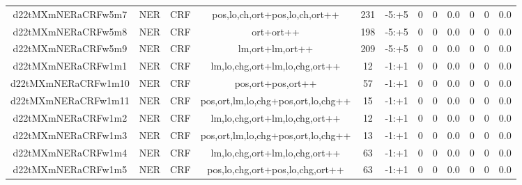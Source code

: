 \documentclass[a4paper]{article}
\begin{document}
\begin{landscape}
\begin{center}
\begin{tabular}{ |c|c|c|c|c|c|c|c|c|c|c|c|}
 
 	
 	\small{ d22tMXmNERaCRFw5m7 } & \small{ NER} & \small{  CRF }  & pos,lo,ch,ort+pos,lo,ch,ort++  &  231 &  \small{  -5:+5 }  &  0 & 0 & 0.0  &  0 & 0 & 0.0 \\
 	

 
 	
 	\small{ d22tMXmNERaCRFw5m8 } & \small{ NER} & \small{  CRF }  & ort+ort++  &  198 &  \small{  -5:+5 }  &  0 & 0 & 0.0  &  0 & 0 & 0.0 \\
 	

 
 	
 	\small{ d22tMXmNERaCRFw5m9 } & \small{ NER} & \small{  CRF }  & lm,ort+lm,ort++  &  209 &  \small{  -5:+5 }  &  0 & 0 & 0.0  &  0 & 0 & 0.0 \\
 	

 
 	
 	\small{ d22tMXmNERaCRFw1m1 } & \small{ NER} & \small{  CRF }  & lm,lo,chg,ort+lm,lo,chg,ort++  &  12 &  \small{  -1:+1 }  &  0 & 0 & 0.0  &  0 & 0 & 0.0 \\
 	

 
 	
 	\small{ d22tMXmNERaCRFw1m10 } & \small{ NER} & \small{  CRF }  & pos,ort+pos,ort++  &  57 &  \small{  -1:+1 }  &  0 & 0 & 0.0  &  0 & 0 & 0.0 \\
 	

 
 	
 	\small{ d22tMXmNERaCRFw1m11 } & \small{ NER} & \small{  CRF }  & pos,ort,lm,lo,chg+pos,ort,lo,chg++  &  15 &  \small{  -1:+1 }  &  0 & 0 & 0.0  &  0 & 0 & 0.0 \\
 	

 
 	
 	\small{ d22tMXmNERaCRFw1m2 } & \small{ NER} & \small{  CRF }  & lm,lo,chg,ort+lm,lo,chg,ort++  &  12 &  \small{  -1:+1 }  &  0 & 0 & 0.0  &  0 & 0 & 0.0 \\
 	

 
 	
 	\small{ d22tMXmNERaCRFw1m3 } & \small{ NER} & \small{  CRF }  & pos,ort,lm,lo,chg+pos,ort,lo,chg++  &  13 &  \small{  -1:+1 }  &  0 & 0 & 0.0  &  0 & 0 & 0.0 \\
 	

 
 	
 	\small{ d22tMXmNERaCRFw1m4 } & \small{ NER} & \small{  CRF }  & lm,lo,chg,ort+lm,lo,chg,ort++  &  63 &  \small{  -1:+1 }  &  0 & 0 & 0.0  &  0 & 0 & 0.0 \\
 	

 
 	
 	\small{ d22tMXmNERaCRFw1m5 } & \small{ NER} & \small{  CRF }  & pos,lo,chg,ort+pos,lo,chg,ort++  &  63 &  \small{  -1:+1 }  &  0 & 0 & 0.0  &  0 & 0 & 0.0 \\
 	


\end{tabular}
\end{center}
\end{landscape}
\end{document}
